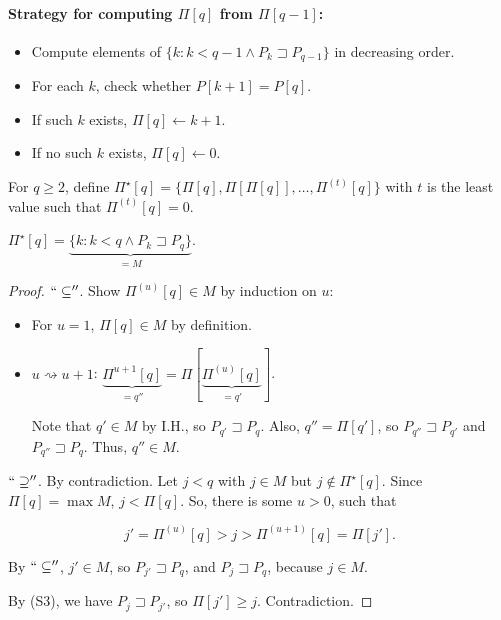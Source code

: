\paragraph{Strategy for computing $\Pi[q]$ from $\Pi[q-1]$:}
\begin{itemize}
	\item Compute elements of $\{k: k < q-1 \wedge P_k \sqsupset P_{q-1}\}$ in decreasing order.
	\item For each $k$, check whether $P[k+1] = P[q]$.
	\item If such $k$ exists, $\Pi[q] \gets k+1$.
	\item If no such $k$ exists, $\Pi[q] \gets 0$.
\end{itemize}

\begin{mydefinition}
For $q \ge 2$, define $\Pi^\star [q] = \{\Pi[q], \Pi[\Pi[q]], \ldots, \Pi^{(t)}[q]\}$ with $t$ is the least value such that $\Pi^{(t)}[q] = 0$.	
\end{mydefinition}

\begin{mylemma}
	$\Pi^\star [q] = \underbrace{\{k : k < q \wedge P_k \sqsupset P_q\}}_{=M}$.
\end{mylemma}
\begin{proof}
	$``\subseteq''$. Show $\Pi^{(u)}[q] \in M$ by induction on $u$:
	\begin{itemize}
		\item For $u=1$, $\Pi[q] \in M$ by definition.
		\item $u \rightsquigarrow u+1$: $\underbrace{\Pi^{u+1}[q]}_{=q''} = \Pi[\underbrace{\Pi^{(u)}[q]}_{=q'}]$.
		
		Note that $q' \in M$ by I.H., so $P_{q'} \sqsupset P_q$. Also, $q'' = \Pi[q']$, so $P_{q''} \sqsupset P_{q'}$ and $P_{q''} \sqsupset P_{q}$. Thus, $q'' \in M$.
	\end{itemize}

	$``\supseteq''$. By contradiction. Let $j < q$ with $j \in M$ but $j \notin \Pi^\star[q]$. Since $\Pi[q] = \max M$, $j < \Pi[q]$. So, there is some $u > 0$, such that
	
	$$j' = \Pi^{(u)}[q] > j > \Pi^{(u+1)}[q] = \Pi[j'].$$
	
	By $``\subseteq''$, $j' \in M$, so $P_{j'} \sqsupset P_q$, and $P_j \sqsupset P_q$, because $j \in M$.
	
	By (S3), we have $P_j \sqsupset P_{j'}$, so $\Pi[j'] \ge j$. Contradiction. 
\end{proof}

